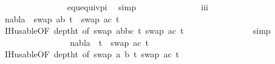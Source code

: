 \begin{isabellebody}
\ \ \ \ \ \ \ \ \ \ \ \ \ \ \isamarkupfalse%
\ equ{\isacharunderscore}{\kern0pt}equiv{\isacharunderscore}{\kern0pt}pi\ \isamarkupfalse%
\ simp\isanewline
\isanewline
\ \ \ \ \ \ \ \ \ \ \ \ \isamarkupfalse%
\ {}{\isacharparenleft}{\kern0pt}{}{\isacharparenright}{\kern0pt}\ iii\ \isamarkupfalse%
\ {\isachardoublequoteopen}nabla\ {\isasymturnstile}\ swap\ {\isacharbrackleft}{\kern0pt}{\isacharparenleft}{\kern0pt}a{\isacharcomma}{\kern0pt}b{\isacharparenright}{\kern0pt}{\isacharbrackright}{\kern0pt}\ t{}{\isacharprime}{\kern0pt}\ {\isasymapprox}\ swap\ {\isacharbrackleft}{\kern0pt}{\isacharparenleft}{\kern0pt}a{\isacharcomma}{\kern0pt}c{\isacharparenright}{\kern0pt}{\isacharbrackright}{\kern0pt}\ t{}{\isacharprime}{\kern0pt}{\isachardoublequoteclose}\isanewline
\ \ \ \ \ \ \ \ \ \ \ \ \ \ \isamarkupfalse%
\ IH{\isacharunderscore}{\kern0pt}usable{\isacharbrackleft}{\kern0pt}OF\ deptht{}{\isacharcomma}{\kern0pt}\ of\ {\isacartoucheopen}swap\ {\isacharparenleft}{\kern0pt}{\isacharbrackleft}{\kern0pt}{\isacharparenleft}{\kern0pt}a{\isacharcomma}{\kern0pt}b{\isacharparenright}{\kern0pt}{\isacharcomma}{\kern0pt}{\isacharparenleft}{\kern0pt}b{\isacharcomma}{\kern0pt}c{\isacharparenright}{\kern0pt}{\isacharbrackright}{\kern0pt}{\isacharparenright}{\kern0pt}\ t{}{\isacharprime}{\kern0pt}{\isacartoucheclose}\ {\isacartoucheopen}swap\ {\isacharbrackleft}{\kern0pt}{\isacharparenleft}{\kern0pt}a{\isacharcomma}{\kern0pt}c{\isacharparenright}{\kern0pt}{\isacharbrackright}{\kern0pt}\ t{}{\isacharprime}{\kern0pt}{\isacartoucheclose}{\isacharbrackright}{\kern0pt}\isanewline
\ \ \ \ \ \ \ \ \ \ \ \ \ \ \isamarkupfalse%
\ simp\isanewline
\isanewline
\ \ \ \ \ \ \ \ \ \ \ \ \isamarkupfalse%
\ {}{\isacharparenleft}{\kern0pt}{}{\isacharcomma}{\kern0pt}{}{\isacharcomma}{\kern0pt}{}{\isacharparenright}{\kern0pt}\ \isamarkupfalse%
\ {\isachardoublequoteopen}nabla\ {\isasymturnstile}\ t{}{\isacharprime}{\kern0pt}\ {\isasymapprox}\ swap\ {\isacharbrackleft}{\kern0pt}{\isacharparenleft}{\kern0pt}a{\isacharcomma}{\kern0pt}c{\isacharparenright}{\kern0pt}{\isacharbrackright}{\kern0pt}\ t{}{\isacharprime}{\kern0pt}{\isachardoublequoteclose}\isanewline
\ \ \ \ \ \ \ \ \ \ \ \ \ \ \isamarkupfalse%
\ IH{\isacharunderscore}{\kern0pt}usable{\isacharbrackleft}{\kern0pt}OF\ deptht{}{\isacharcomma}{\kern0pt}\ of\ {\isacartoucheopen}swap\ {\isacharbrackleft}{\kern0pt}{\isacharparenleft}{\kern0pt}a{\isacharcomma}{\kern0pt}\ b{\isacharparenright}{\kern0pt}{\isacharbrackright}{\kern0pt}\ t{}{\isacharprime}{\kern0pt}{\isacartoucheclose}\ {\isacartoucheopen}swap\ {\isacharbrackleft}{\kern0pt}{\isacharparenleft}{\kern0pt}a{\isacharcomma}{\kern0pt}c{\isacharparenright}{\kern0pt}{\isacharbrackright}{\kern0pt}\ t{}{\isacharprime}{\kern0pt}{\isacartoucheclose}{\isacharbrackright}{\kern0pt}\isanewline

\end{isabellebody}
